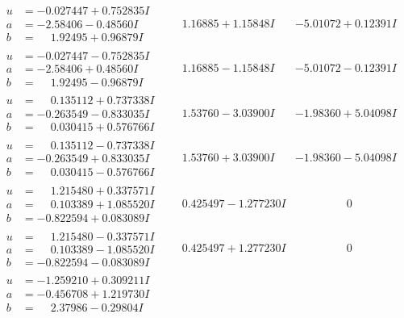 \documentclass[1p]{elsarticle_modified}
\theoremstyle{definition}
\begin{document}
$$\begin{array}{c|c|c}
\begin{aligned}
u &= -0.027447 + 0.752835 I \\
a &= -2.58406 - 0.48560 I \\
b &= \phantom{-}1.92495 + 0.96879 I\end{aligned}
 & \phantom{-}1.16885 + 1.15848 I & -5.01072 + 0.12391 I \\ \hline\begin{aligned}
u &= -0.027447 - 0.752835 I \\
a &= -2.58406 + 0.48560 I \\
b &= \phantom{-}1.92495 - 0.96879 I\end{aligned}
 & \phantom{-}1.16885 - 1.15848 I & -5.01072 - 0.12391 I \\ \hline\begin{aligned}
u &= \phantom{-}0.135112 + 0.737338 I \\
a &= -0.263549 - 0.833035 I \\
b &= \phantom{-}0.030415 + 0.576766 I\end{aligned}
 & \phantom{-}1.53760 - 3.03900 I & -1.98360 + 5.04098 I \\ \hline\begin{aligned}
u &= \phantom{-}0.135112 - 0.737338 I \\
a &= -0.263549 + 0.833035 I \\
b &= \phantom{-}0.030415 - 0.576766 I\end{aligned}
 & \phantom{-}1.53760 + 3.03900 I & -1.98360 - 5.04098 I \\ \hline\begin{aligned}
u &= \phantom{-}1.215480 + 0.337571 I \\
a &= \phantom{-}0.103389 + 1.085520 I \\
b &= -0.822594 + 0.083089 I\end{aligned}
 & \phantom{-}0.425497 - 1.277230 I & \phantom{-0.000000 } 0 \\ \hline\begin{aligned}
u &= \phantom{-}1.215480 - 0.337571 I \\
a &= \phantom{-}0.103389 - 1.085520 I \\
b &= -0.822594 - 0.083089 I\end{aligned}
 & \phantom{-}0.425497 + 1.277230 I & \phantom{-0.000000 } 0 \\ \hline\begin{aligned}
u &= -1.259210 + 0.309211 I \\
a &= -0.456708 + 1.219730 I \\
b &= \phantom{-}2.37986 - 0.29804 I\end{aligned}

\end{array}$$
\end{document}
